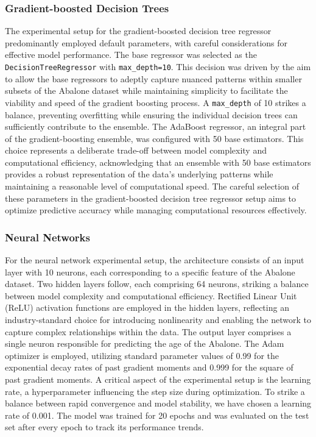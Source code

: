 \documentclass[12pt]{article}
\begin{document}
\subsubsection{Gradient-boosted Decision Trees}

The experimental setup for the gradient-boosted decision tree regressor predominantly employed default parameters, with careful considerations for effective model performance. The base regressor was selected as the \texttt{DecisionTreeRegressor} with \texttt{max\_depth=10}. This decision was driven by the aim to allow the base regressors to adeptly capture nuanced patterns within smaller subsets of the Abalone dataset while maintaining simplicity to facilitate the viability and speed of the gradient boosting process. A \texttt{max\_depth} of 10 strikes a balance, preventing overfitting while ensuring the individual decision trees can sufficiently contribute to the ensemble. The AdaBoost regressor, an integral part of the gradient-boosting ensemble, was configured with 50 base estimators. This choice represents a deliberate trade-off between model complexity and computational efficiency, acknowledging that an ensemble with 50 base estimators provides a robust representation of the data's underlying patterns while maintaining a reasonable level of computational speed. The careful selection of these parameters in the gradient-boosted decision tree regressor setup aims to optimize predictive accuracy while managing computational resources effectively.

\subsubsection{Neural Networks}

For the neural network experimental setup, the architecture consists of an input layer with 10 neurons, each corresponding to a specific feature of the Abalone dataset. Two hidden layers follow, each comprising 64 neurons, striking a balance between model complexity and computational efficiency. Rectified Linear Unit (ReLU) activation functions are employed in the hidden layers, reflecting an industry-standard choice for introducing nonlinearity and enabling the network to capture complex relationships within the data. The output layer comprises a single neuron responsible for predicting the age of the Abalone. The Adam optimizer is employed, utilizing standard parameter values of 0.99 for the exponential decay rates of past gradient moments and 0.999 for the square of past gradient moments. A critical aspect of the experimental setup is the learning rate, a hyperparameter influencing the step size during optimization. To strike a balance between rapid convergence and model stability, we have chosen a learning rate of 0.001. The model was trained for 20 epochs and was evaluated on the test set after every epoch to track its performance trends.
\end{document}
